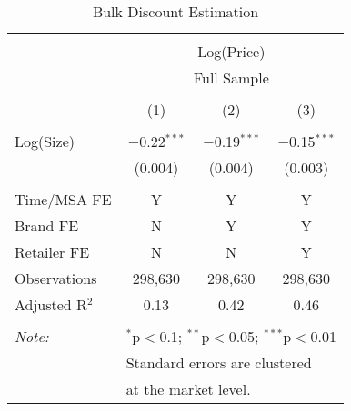 
\begin{table}[!htbp] \centering 
  \caption{Bulk Discount Estimation} 
  \label{tab:bulkDiscount} 
\begin{tabular}{@{\extracolsep{5pt}}lccc} 
\\[-1.8ex]\hline 
\hline \\[-1.8ex] 
 & \multicolumn{3}{c}{Log(Price)} \\ 
\cline{2-4} 
 & \multicolumn{3}{c}{Full Sample} \\ 
\\[-1.8ex] & (1) & (2) & (3)\\ 
\hline \\[-1.8ex] 
 Log(Size) & $-$0.22$^{***}$ & $-$0.19$^{***}$ & $-$0.15$^{***}$ \\ 
  & (0.004) & (0.004) & (0.003) \\ 
 \hline \\[-1.8ex] 
Time/MSA FE & Y & Y & Y \\ 
Brand FE & N & Y & Y \\ 
Retailer FE & N & N & Y \\ 
Observations & 298,630 & 298,630 & 298,630 \\ 
Adjusted R$^{2}$ & 0.13 & 0.42 & 0.46 \\ 
\hline 
\hline \\[-1.8ex] 
\textit{Note:}  & \multicolumn{3}{l}{$^{*}$p$<$0.1; $^{**}$p$<$0.05; $^{***}$p$<$0.01} \\ 
 & \multicolumn{3}{l}{Standard errors are clustered } \\ 
 & \multicolumn{3}{l}{at the market level.} \\ 
\end{tabular} 
\end{table} 
